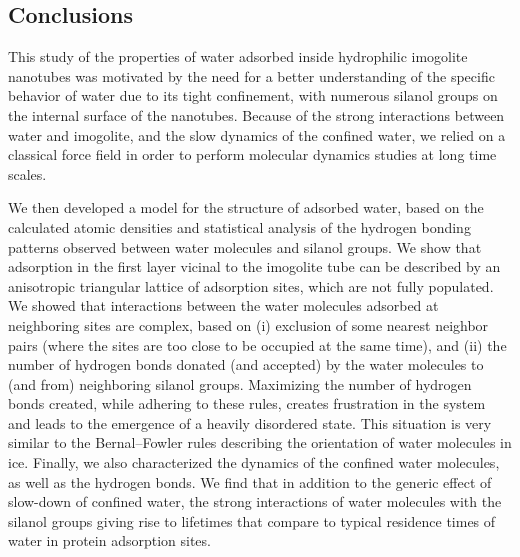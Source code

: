\documentclass[thesis]{subfiles}
\begin{document}
\subsection*{Conclusions}

This study of the properties of water adsorbed inside hydrophilic imogolite
nanotubes was motivated by the need for a better understanding of the specific
behavior of water due to its tight confinement, with numerous silanol groups on
the internal surface of the nanotubes. Because of the strong interactions
between water and imogolite, and the slow dynamics of the confined water, we
relied on a classical force field in order to perform molecular dynamics
studies at long time scales.

We then developed a model for the structure of adsorbed water, based on the
calculated atomic densities and statistical analysis of the hydrogen bonding
patterns observed between water molecules and silanol groups. We show that
adsorption in the first layer vicinal to the imogolite tube can be described by
an anisotropic triangular lattice of adsorption sites, which are not fully
populated. We showed that interactions between the water molecules adsorbed at
neighboring sites are complex, based on (i) exclusion of some nearest neighbor
pairs (where the sites are too close to be occupied at the same time), and (ii)
the number of hydrogen bonds donated (and accepted) by the water molecules to
(and from) neighboring silanol groups. Maximizing the number of hydrogen bonds
created, while adhering to these rules, creates frustration in the system and
leads to the emergence of a heavily disordered state. This situation is very
similar to the Bernal--Fowler rules describing the orientation of water
molecules in ice\cite{Bernal1933}. Finally, we also characterized the dynamics
of the confined water molecules, as well as the hydrogen bonds. We find that in
addition to the generic effect of slow-down of confined water, the strong
interactions of water molecules with the silanol groups giving rise to lifetimes
that compare to typical residence times of water in protein adsorption sites.

\OnlyInSubfile{\printglobalbibliography}
\end{document}
